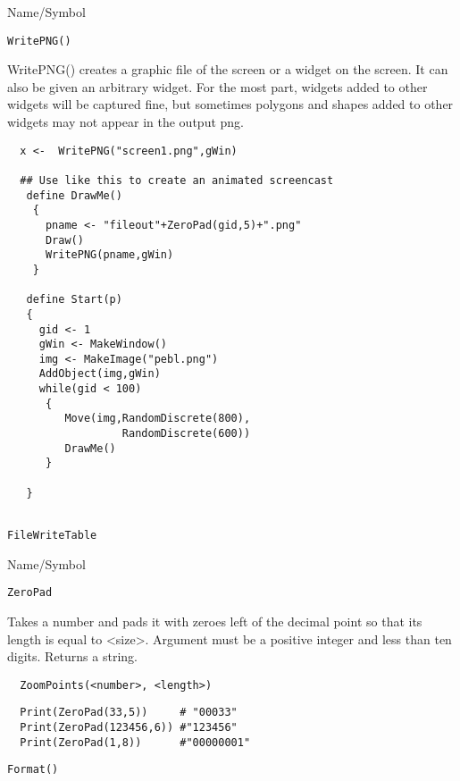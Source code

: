 \begin{desc}{Name/Symbol}
\item[Name/Symbol]	\verb+WritePNG()+

\item[Description] WritePNG() creates a graphic file of the screen or
  a widget on the screen.  It can also be given an arbitrary widget.
  For the most part, widgets added to other widgets will be captured
  fine, but sometimes polygons and shapes added to other widgets may
  not appear in the output png.

\item[Usage]

\begin{verbatim}
  x <-  WritePNG("screen1.png",gWin)

  ## Use like this to create an animated screencast
   define DrawMe()
    {
      pname <- "fileout"+ZeroPad(gid,5)+".png"
      Draw()
      WritePNG(pname,gWin)
    }
  
   define Start(p)  
   {
     gid <- 1
     gWin <- MakeWindow()
     img <- MakeImage("pebl.png")
     AddObject(img,gWin)
     while(gid < 100)
      {
         Move(img,RandomDiscrete(800),
                  RandomDiscrete(600))
         DrawMe()
      }

   }   
  
\end{verbatim}
\item[See Also]	\verb+FileWriteTable+
\end{desc}

\vfill
\newpage

\vfill


\begin{desc}{Name/Symbol}
\item[Name/Symbol]	\verb+ZeroPad+

\item[Description]  Takes a number and pads it with zeroes left of the
  decimal point so that its length is equal to <size>. Argument must
  be a positive integer and less than ten digits.  Returns a string.


\item[Usage]
\begin{verbatim}
  ZoomPoints(<number>, <length>)
\end{verbatim}

\item[Example] 
\begin{verbatim}
  Print(ZeroPad(33,5))     # "00033"
  Print(ZeroPad(123456,6)) #"123456"
  Print(ZeroPad(1,8))      #"00000001"
\end{verbatim}

\item[See Also] \verb+Format()+
\end{desc}



